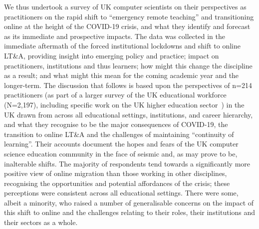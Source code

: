 \documentclass[sigconf]{acmart}
\begin{document}

We thus undertook a survey of UK computer scientists on their
perspectives as practitioners on the rapid shift to ``emergency remote
teaching'' and transitioning online at the height of the COVID-19
crisis, and what they identify and forecast as its immediate and
prospective impacts. The data was collected in the immediate aftermath
of the forced institutional lockdowns and shift to online LT\&A,
providing insight into emerging policy and practice; impact on
practitioners, institutions and thus learners; how might this change
the discipline as a result; and what might this mean for the coming
academic year and the longer-term.  The discussion that follows is
based upon the perspectives of n=214 practitioners (as part of a
larger survey of the UK educational workforce (N=2,197), including
specific work on the UK higher education
sector~\cite{watermeyer-et-al:he2020}) in the UK drawn from across all
educational settings, institutions, and career hierarchy, and what
they recognise to be the major consequences of COVID-19, the
transition to online LT\&A and the challenges of maintaining
``continuity of learning''. Their accounts document the hopes and
fears of the UK computer science education community in the face of
seismic and, as may prove to be, inalterable shifts. The majority of
respondents tend towards a significantly more positive view of online
migration than those working in other disciplines, recognising the
opportunities and potential affordances of the crisis; these
perceptions were consistent across all educational settings. There
were some, albeit a minority, who raised a number of generalisable
concerns on the impact of this shift to online and the challenges
relating to their roles, their institutions and their sectors as a
whole.

\end{document}
